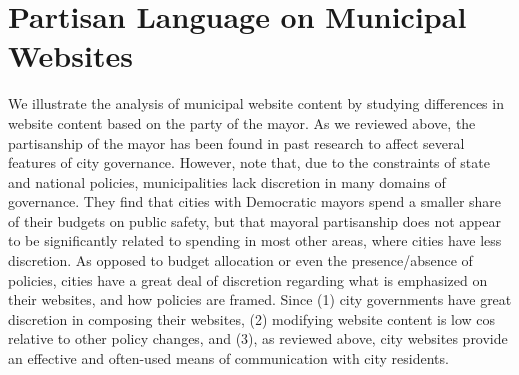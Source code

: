 \documentclass[11pt]{article}
\begin{document}
\section{Partisan Language on Municipal Websites}

We illustrate the analysis of municipal website content by studying differences in website content based on the party of the mayor. As we reviewed above, the partisanship of the mayor has been found in past research to affect several features of city governance. However, \citet{gerber2011mayors} note that, due to the constraints of state and national policies, municipalities lack discretion in many domains of governance. They find that cities with Democratic mayors spend a smaller share of their budgets on public safety, but that mayoral partisanship does not appear to be significantly related to spending in most other areas, where cities have less discretion. As opposed to budget allocation or even the presence/absence of policies, cities have a great deal of discretion regarding what is emphasized on their websites, and how policies are framed. Since (1) city governments have great discretion in composing their websites, (2) modifying website content is low cos relative to other policy changes, and (3), as reviewed above, city websites provide an effective and often-used means of communication with city residents.

\end{document}
